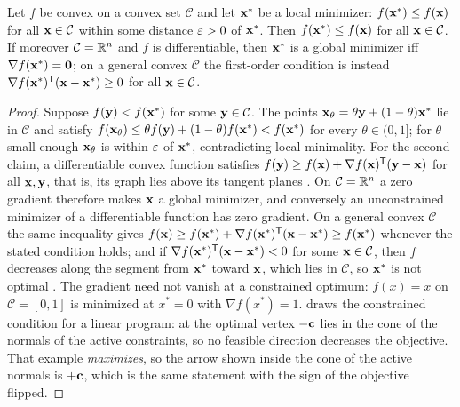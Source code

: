 \begin{proposition}
\label{thm:appB-local-global}
Let $f$ be convex on a convex set $\mathcal{C}$ and let $\mathbf{x}^*$ be a local minimizer: $f(\mathbf{x}^*) \le f(\mathbf{x})$ for all $\mathbf{x} \in \mathcal{C}$ within some distance $\varepsilon > 0$ of $\mathbf{x}^*$. Then $f(\mathbf{x}^*) \le f(\mathbf{x})$ for all $\mathbf{x} \in \mathcal{C}$. If moreover $\mathcal{C} = \mathbb{R}^n$ and $f$ is differentiable, then $\mathbf{x}^*$ is a global minimizer iff $\nabla f(\mathbf{x}^*) = \mathbf{0}$; on a general convex $\mathcal{C}$ the first-order condition is instead $\nabla f(\mathbf{x}^*)^{\mathsf{T}}(\mathbf{x} - \mathbf{x}^*) \ge 0$ for all $\mathbf{x} \in \mathcal{C}$.
\end{proposition}
\begin{proof}
Suppose $f(\mathbf{y}) < f(\mathbf{x}^*)$ for some $\mathbf{y} \in \mathcal{C}$. The points $\mathbf{x}_\theta = \theta\mathbf{y} + (1-\theta)\mathbf{x}^*$ lie in $\mathcal{C}$ and satisfy $f(\mathbf{x}_\theta) \le \theta f(\mathbf{y}) + (1-\theta)f(\mathbf{x}^*) < f(\mathbf{x}^*)$ for every $\theta \in (0, 1]$; for $\theta$ small enough $\mathbf{x}_\theta$ is within $\varepsilon$ of $\mathbf{x}^*$, contradicting local minimality. For the second claim, a differentiable convex function satisfies $f(\mathbf{y}) \ge f(\mathbf{x}) + \nabla f(\mathbf{x})^{\mathsf{T}}(\mathbf{y} - \mathbf{x})$ for all $\mathbf{x}, \mathbf{y}$, that is, its graph lies above its tangent planes \cite[Section~3.1]{boyd2004convex}. On $\mathcal{C} = \mathbb{R}^n$ a zero gradient therefore makes $\mathbf{x}$ a global minimizer, and conversely an unconstrained minimizer of a differentiable function has zero gradient. On a general convex $\mathcal{C}$ the same inequality gives $f(\mathbf{x}) \ge f(\mathbf{x}^*) + \nabla f(\mathbf{x}^*)^{\mathsf{T}}(\mathbf{x} - \mathbf{x}^*) \ge f(\mathbf{x}^*)$ whenever the stated condition holds; and if $\nabla f(\mathbf{x}^*)^{\mathsf{T}}(\mathbf{x} - \mathbf{x}^*) < 0$ for some $\mathbf{x} \in \mathcal{C}$, then $f$ decreases along the segment from $\mathbf{x}^*$ toward $\mathbf{x}$, which lies in $\mathcal{C}$, so $\mathbf{x}^*$ is not optimal \cite[Section~4.2]{boyd2004convex}. The gradient need not vanish at a constrained optimum: $f(x) = x$ on $\mathcal{C} = [0, 1]$ is minimized at $x^* = 0$ with $\nabla f(x^*) = 1$.  draws the constrained condition for a linear program: at the optimal vertex $-\mathbf{c}$ lies in the cone of the normals of the active constraints, so no feasible direction decreases the objective. That example \emph{maximizes}, so the arrow shown inside the cone of the active normals is $+\mathbf{c}$, which is the same statement with the sign of the objective flipped. \qedhere
\end{proof}

